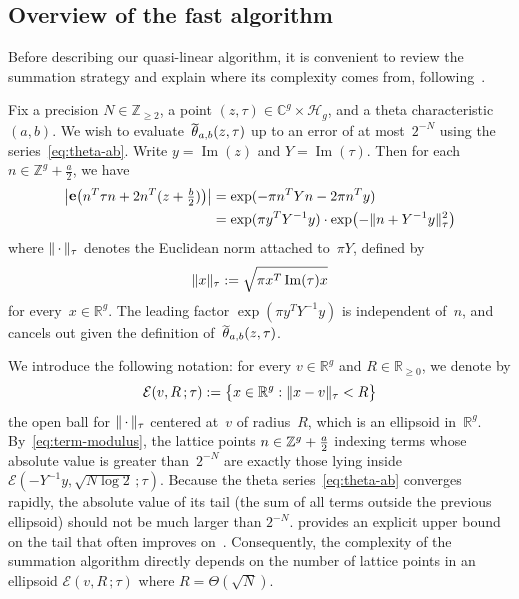 \documentclass[12pt,oneside]{amsart}
\numberwithin{equation}{section}
\theoremstyle{definition}
\newcommand{\Z}{\mathbb{Z}}
\newcommand{\R}{\mathbb{R}}
\newcommand{\C}{\mathbb{C}}
\newcommand{\Half}{\mathcal{H}}
\newcommand{\placeholder}{\,\cdot\,}
\newcommand{\eld}[3]{\ensuremath{\mathcal{E}(#1, #2\,; #3)}}
\DeclareMathOperator{\im}{Im}
\DeclareMathOperator{\thetatilde}{\rlap{\raisebox{-0.1ex}{$\widetilde{\phantom{\,t}}$}}\theta}
\DeclareMathOperator{\e}{\mathbf{e}}
\DeclarePairedDelimiter{\abs}{|}{|}
\DeclarePairedDelimiter{\paren}{(}{)}
\DeclarePairedDelimiter{\braces}{\{}{\}}
\DeclarePairedDelimiter{\norm}{\|}{\|}
\begin{document}
\subsection{Overview of the fast algorithm}
\label{subsec:intro-overview}

Before describing our quasi-linear algorithm, it is convenient to review the
summation strategy and explain where its complexity comes from,
following~\cite[§3]{deconinckComputingRiemannTheta2004}.

Fix a precision $N\in \Z_{\geq 2}$, a point $(z,\tau)\in \C^g\times \Half_g$,
and a theta characteristic~$(a,b)$. We wish to
evaluate~$\thetatilde_{a,b}(z,\tau)$ up to an error of at most~$2^{-N}$ using
the series~\eqref{eq:theta-ab}. Write $y = \im(z)$ and $Y = \im(\tau)$.
Then for each~$n\in \Z^g + \tfrac a2$, we have
\begin{equation}
  \label{eq:term-modulus}
  \begin{aligned}
    \abs[\big]{\e\paren[\big]{n^T\tau n + 2n^T (z + \tfrac b2)}} &= \exp(-\pi n^T Y n - 2\pi n^T y)\\
    &= \exp(\pi y^T Y^{-1} y) \cdot \exp \paren[\big]{- \norm{n + Y^{-1}y}_\tau^2}
  \end{aligned}
\end{equation}
where $\norm{\placeholder}_\tau$ denotes the Euclidean norm attached
to~$\pi Y$, defined by
\begin{equation}
  \label{eq:def-norm}
  \norm{x}_\tau := \sqrt{\pi x^T \im(\tau) x}
\end{equation}
for every~$x\in\R^g$. The leading factor $\exp(\pi y^T Y^{-1} y)$ is
independent of~$n$, and cancels out given the definition
of~$\thetatilde_{a,b}(z,\tau)$.

We introduce the following notation: for every $v\in \R^g$ and
$R\in\R_{\geq 0}$, we denote by
\begin{equation}
  \label{eq:def-ellipsoid}
  \eld{v}{R}{\tau} := \braces[\big]{x\in \R^g: \norm{x - v}_\tau < R}
\end{equation}
the open ball for $\norm{\placeholder}_\tau$ centered at~$v$ of radius~$R$,
which is an ellipsoid in~$\R^g$.  By~\eqref{eq:term-modulus}, the lattice
points $n\in \Z^g + \smash{\tfrac a2}$ indexing terms whose absolute value is
greater than~$2^{-N}$ are exactly those lying inside
$\eld{-Y^{-1}y}{\sqrt{N\log 2}}{\tau}$. Because the theta
series~\eqref{eq:theta-ab} converges rapidly, the absolute value of its tail
(the sum of all terms outside the previous ellipsoid) should not be much larger
than $2^{-N}$.  provides an explicit upper bound
on the tail that often improves on~\cite[Lemma
2]{deconinckComputingRiemannTheta2004}. Consequently, the complexity of the
summation algorithm directly depends on the number of lattice points in an
ellipsoid $\eld{v}{R}{\tau}$ where $R = \Theta(\sqrt{N})$.
\end{document}
